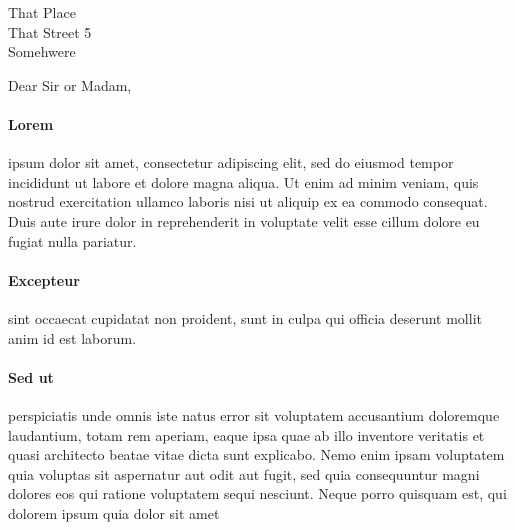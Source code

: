 \documentclass[roboto,noadress,custcol]{friggeri-txt}                       %
\begin{document}

\begin{letter}{                                                                           %
That Place \\                                                                             %
That Street 5 \\
Somehwere}

\opening{Dear Sir or Madam,}
\paragraph{Lorem}{ipsum dolor sit amet, consectetur adipiscing elit, sed do eiusmod tempor incididunt ut labore et dolore magna aliqua. Ut enim ad minim veniam, quis nostrud exercitation ullamco laboris nisi ut aliquip ex ea commodo consequat. Duis aute irure dolor in reprehenderit in voluptate velit esse cillum dolore eu fugiat nulla pariatur.}\\[6pt]
\paragraph{Excepteur}{sint occaecat cupidatat non proident, sunt in culpa qui officia deserunt mollit anim id est laborum.}\\[6pt]
\paragraph{Sed ut}{perspiciatis unde omnis iste natus error sit voluptatem accusantium doloremque laudantium, totam rem aperiam, eaque ipsa quae ab illo inventore veritatis et quasi architecto beatae vitae dicta sunt explicabo. Nemo enim ipsam voluptatem quia voluptas sit aspernatur aut odit aut fugit, sed quia consequuntur magni dolores eos qui ratione voluptatem sequi nesciunt. Neque porro quisquam est, qui dolorem ipsum quia dolor sit amet}\\[6pt]

\end{letter}
\end{document}
